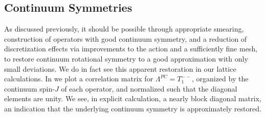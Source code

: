 




\subsection{Continuum Symmetries} \label{sec::Spec:corrConstructContSym}
As discussed previously, it should be possible through appropriate smearing, construction of operators with good continuum symmetry, and a reduction of discretization effects via improvements to the action and a sufficiently fine mesh, to restore continuum rotational symmetry to a good approximation with only small deviations. We do in fact see this apparent restoration in our lattice calculations. In  we plot a correlation matrix for $\Lambda^{PC} = T_1^{--}$, organized by the continuum spin-$J$ of each operator, and normalized such that the diagonal elements are unity. We see, in explicit calculation, a nearly block diagonal matrix, an indication that the underlying continuum symmetry is approximately restored. 

